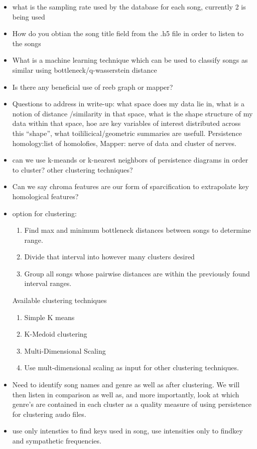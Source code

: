 \documentclass[11pt, a4paper]{article}
\begin{document}
  \begin{itemize}
  \item what is the sampling rate used by the database for each song, currently 2 is being used
  \item How do you obtian the song title field from the .h5 file in order to listen to the songs
  \item What is a machine learning technique which can be used to classify songs as similar using bottleneck/q-wasserstein distance
  \item Is there any beneficial use of reeb graph or mapper?
  \item Questions to address in write-up: what space does my data lie in, what is a notion of distance /similarity in that space, what is the shape structure of my data within that space, hoe are key variables of interest distributed across this ``shape'', what toililicical/geometric summaries are usefull. Persistence homology:list of homolofies, Mapper: nerve of data and cluster of nerves.
  \item can we use k-meands or k-nearest neighbors of persistence diagrams in order to cluster? other clustering techniques?
  \item Can we say chroma features are our form of sparcification to extrapolate key homological features?
  \item option for clustering:
    \begin{enumerate}
    \item Find max and minimum bottleneck distances between songs to determine range.
    \item Divide that interval into however many clusters desired
    \item Group all songs whose pairwise distances are within the previously found interval ranges.
    \end{enumerate}
    Available clustering techniques
    \begin{enumerate}
    \item Simple K means
    \item K-Medoid clustering
    \item Multi-Dimensional Scaling
    \item Use mult-dimensional scaling as input for other clustering techniques. 
    \end{enumerate}
  \item Need to identify song names and genre as well as after clustering. We will then listen in comparison as well as, and more importantly, look at which genre's are contained in each cluster as a quality measure of using persistence for clustering audo files.
  \item use only intensties to find keys used in song, use intensities only to findkey and sympathetic frequencies.
  \end{itemize}
  
\end{document}
